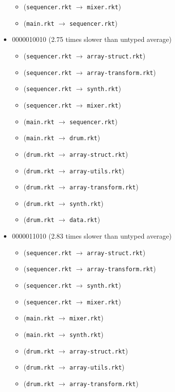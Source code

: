 \documentclass{article}
\newcommand{\mono}[1]{\texttt{#1}}
\begin{document}
\begin{itemize}
\begin{itemize}
  \item (\mono{sequencer.rkt} $\rightarrow$ \mono{mixer.rkt})
  \item (\mono{main.rkt} $\rightarrow$ \mono{sequencer.rkt})
  \end{itemize}
\item 0000010010 (2.75 times slower than untyped average)
  \begin{itemize}
  \item (\mono{sequencer.rkt} $\rightarrow$ \mono{array-struct.rkt})
  \item (\mono{sequencer.rkt} $\rightarrow$ \mono{array-transform.rkt})
  \item (\mono{sequencer.rkt} $\rightarrow$ \mono{synth.rkt})
  \item (\mono{sequencer.rkt} $\rightarrow$ \mono{mixer.rkt})
  \item (\mono{main.rkt} $\rightarrow$ \mono{sequencer.rkt})
  \item (\mono{main.rkt} $\rightarrow$ \mono{drum.rkt})
  \item (\mono{drum.rkt} $\rightarrow$ \mono{array-struct.rkt})
  \item (\mono{drum.rkt} $\rightarrow$ \mono{array-utils.rkt})
  \item (\mono{drum.rkt} $\rightarrow$ \mono{array-transform.rkt})
  \item (\mono{drum.rkt} $\rightarrow$ \mono{synth.rkt})
  \item (\mono{drum.rkt} $\rightarrow$ \mono{data.rkt})
  \end{itemize}
\item 0000011010 (2.83 times slower than untyped average)
  \begin{itemize}
  \item (\mono{sequencer.rkt} $\rightarrow$ \mono{array-struct.rkt})
  \item (\mono{sequencer.rkt} $\rightarrow$ \mono{array-transform.rkt})
  \item (\mono{sequencer.rkt} $\rightarrow$ \mono{synth.rkt})
  \item (\mono{sequencer.rkt} $\rightarrow$ \mono{mixer.rkt})
  \item (\mono{main.rkt} $\rightarrow$ \mono{mixer.rkt})
  \item (\mono{main.rkt} $\rightarrow$ \mono{synth.rkt})
  \item (\mono{drum.rkt} $\rightarrow$ \mono{array-struct.rkt})
  \item (\mono{drum.rkt} $\rightarrow$ \mono{array-utils.rkt})
  \item (\mono{drum.rkt} $\rightarrow$ \mono{array-transform.rkt})

\end{itemize}
\end{itemize}
\end{document}
